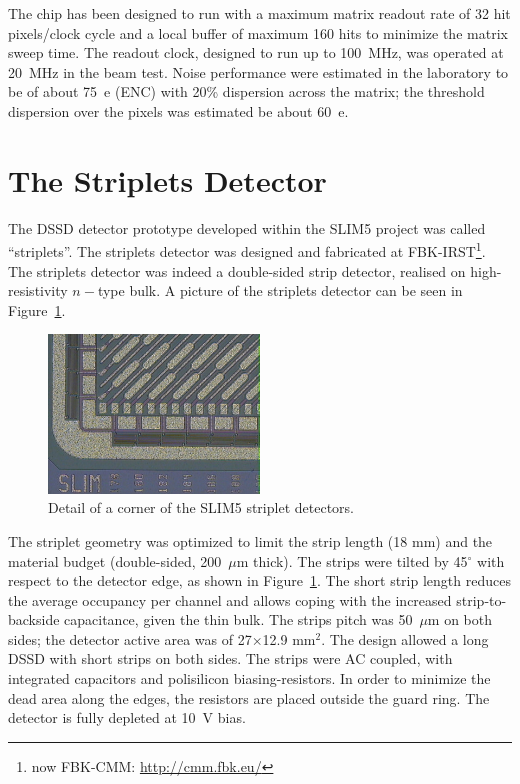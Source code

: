 The chip has been designed to run with a maximum matrix readout rate of 32 hit pixels/clock cycle and 
a local buffer of maximum 160 hits to minimize the matrix sweep time.
The readout clock, designed to run up to 100~MHz, was operated at 20~MHz in the beam test.
Noise performance were estimated in the laboratory to be of about 75~e (ENC) with 20\% dispersion 
across the matrix; the threshold dispersion over the pixels was estimated be about 60~e.

\section{The Striplets Detector}
\label{sec:Striplets}

The DSSD detector prototype  developed within the SLIM5 project was called ``striplets''. 
The striplets detector was designed and fabricated at FBK-IRST\footnote{now FBK-CMM: \url{http://cmm.fbk.eu/}}.
The striplets detector was indeed a double-sided strip detector, realised on high-resistivity 
$n-$type bulk. A picture of the striplets detector can be seen in Figure~\ref{fig:striplets}.

\begin{figure}[!htpb]
\centering
\includegraphics[width=0.5\textwidth]{striplets.jpg}
\caption{\label{fig:striplets} Detail of a corner of the SLIM5 striplet detectors.}
\end{figure}

The striplet geometry was optimized to limit the strip length (18 mm) and the material budget 
(double-sided, 200~$\mu$m thick). The strips were tilted by 45$^{\circ}$ with respect to the 
detector edge, as shown in Figure~\ref{fig:striplets}. The short strip length reduces the average 
occupancy per channel and allows coping with the increased strip-to-backside capacitance, given 
the thin bulk. The strips pitch was 50~$\mu$m on both sides; the detector active area was 
of 27$\times$12.9 mm$^2$. The design allowed a long DSSD with short strips on both sides.
The strips were AC coupled, with integrated capacitors and polisilicon biasing-resistors. 
In order to minimize the dead area along the edges, the resistors are placed outside the guard ring. 
The detector is fully depleted at 10~V bias.

